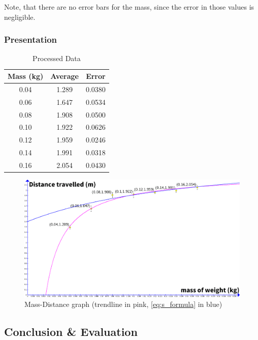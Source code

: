 \documentclass[titlepage,12pt]{article}
\let\oldsubsection\subsection
\renewcommand\subsection{\FloatBarrier \oldsubsection}
\begin{document}
Note, that there are no error bars for the mass, since the error in those values is
negligible.

\subsubsection{Presentation}

\begin{table}[H]
    \centering
    \def\arraystretch{1.5}
    \begin{tabular}{c|c|c}
        Mass (kg) & Average & Error\\ 
        \hline
        \hline
        0.04 & 1.289 & 0.0380\\ 
        \hline
        0.06 & 1.647 & 0.0534\\ 
        \hline
        0.08 & 1.908 & 0.0500\\ 
        \hline
        0.10 & 1.922 & 0.0626\\ 
        \hline
        0.12 & 1.959 & 0.0246\\ 
        \hline
        0.14 & 1.991 & 0.0318\\ 
        \hline
        0.16 & 2.054 & 0.0430\\ 
    \end{tabular}
    \caption{Processed Data} 
    \label{table:processed data}
\end{table}

\begin{figure}[H]
    \label{fig:mass-distance-graph}
    \centering
    \includegraphics[scale=0.28]{mass-distance_graph}
    \caption{Mass-Distance graph (trendline in pink, 
        \autoref{eq:s_formula} in blue)}
\end{figure}


\subsection{Conclusion \& Evaluation}
\end{document}

